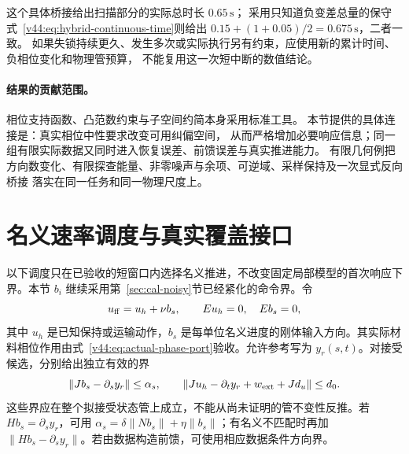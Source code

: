\documentclass[11pt,a4paper]{article}
\numberwithin{equation}{section}
\theoremstyle{definition}
\begin{document}
这个具体桥接给出扫描部分的实际总时长 $0.65\,\mathrm{s}$；
采用只知道负变差总量的保守式~\eqref{v44:eq:hybrid-continuous-time}则给出
$0.15+(1+0.05)/2=0.675\,\mathrm{s}$，二者一致。
如果失锁持续更久、发生多次或实际执行另有约束，应使用新的累计时间、负相位变化和物理管预算，
不能复用这一次短中断的数值结论。

\paragraph{结果的贡献范围。}
相位支持函数、凸范数约束与子空间约简本身采用标准工具。
本节提供的具体连接是：真实相位中性要求改变可用纠偏空间，
从而严格增加必要响应信息；同一组有限实际数据又同时进入恢复误差、前馈误差与真实推进能力。
有限几何例把方向数变化、有限探查能量、非零噪声与余项、可逆域、采样保持及一次显式反向桥接
落实在同一任务和同一物理尺度上。


\section{名义速率调度与真实覆盖接口}
\label{sec:rev:positive-progress}
以下调度只在已验收的短窗口内选择名义推进，不改变固定局部模型的首次响应下界。本节 $b_i$ 继续采用第~\ref{sec:cal-noisy}节已经紧化的命令界。令
\begin{equation}
 u_{\rm ff}=u_h+\nu b_s,\qquad
 Eu_h=0,\quad Eb_s=0,
 \label{eq:rev:progress-feedforward}
\end{equation}
其中 $u_h$ 是已知保持或运输动作，$b_s$ 是每单位名义进度的刚体输入方向。其实际材料相位作用由式~\eqref{v44:eq:actual-phase-port}验收。允许参考写为 $y_r(s,t)$。对接受候选，分别给出独立有效的界
\begin{equation}
 \|Jb_s-\partial_s y_r\|\le\alpha_s,
 \qquad
 \|Ju_h-\partial_t y_r+w_{\rm ext}+Jd_u\|\le d_0.
 \label{eq:rev:progress-residual}
\end{equation}
这些界应在整个拟接受状态管上成立，不能从尚未证明的管不变性反推。若 $Hb_s=\partial_s y_r$，可用 $\alpha_s=\delta\|Nb_s\|+\eta\|b_s\|$；有名义不匹配时再加 $\|Hb_s-\partial_s y_r\|$。若由数据构造前馈，可使用相应数据条件方向界。
\end{document}
